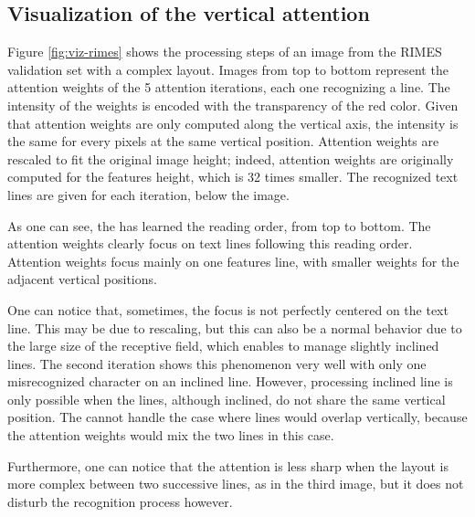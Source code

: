 \subsection{Visualization of the vertical attention }
Figure \ref{fig:viz-rimes} shows the processing steps of an image from the RIMES validation set with a complex layout. Images from top to bottom represent the attention weights of the 5 attention iterations, each one recognizing a line. The intensity of the weights is encoded with the transparency of the red color. Given that attention weights are only computed along the vertical axis, the intensity is the same for every pixels at the same vertical position. Attention weights are rescaled to fit the original image height; indeed, attention weights are originally computed for the features height, which is 32 times smaller. The recognized text lines are given for each iteration, below the image. 

As one can see, the \modelacc{} has learned the reading order, from top to bottom. The attention weights clearly focus on text lines following this reading order. Attention weights focus mainly on one features line, with smaller weights for the adjacent vertical positions. 

One can notice that, sometimes, the focus is not perfectly centered on the text line. This may be due to rescaling, but this can also be a normal behavior due to the large size of the receptive field, which enables to manage slightly inclined lines. The second iteration shows this phenomenon very well with only one misrecognized character on an inclined line. However, processing inclined line is only possible when the lines, although inclined, do not share the same vertical position. The \modelacc{} cannot handle the case where lines would overlap vertically, because the attention weights would mix the two lines in this case.

Furthermore, one can notice that the attention is less sharp when the layout is more complex between two successive lines, as in the third image, but it does not disturb the recognition process however. 


